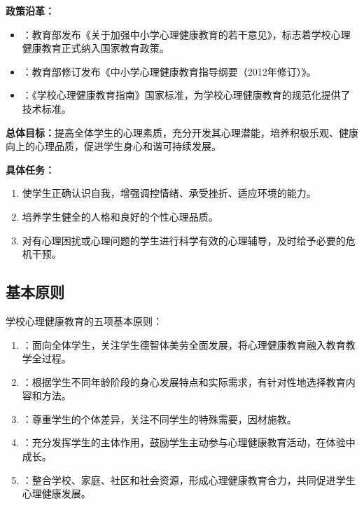 \begin{defbox}
\textbf{政策沿革：}

\begin{itemize}[leftmargin=*]
    \item {}：教育部发布《关于加强中小学心理健康教育的若干意见》，标志着学校心理健康教育正式纳入国家教育政策。
    \item {}：教育部修订发布《中小学心理健康教育指导纲要（2012年修订）》。
    \item {}：《学校心理健康教育指南》国家标准，为学校心理健康教育的规范化提供了技术标准。
\end{itemize}

\textbf{总体目标：}提高全体学生的心理素质，充分开发其心理潜能，培养积极乐观、健康向上的心理品质，促进学生身心和谐可持续发展。

\textbf{具体任务：}
\begin{enumerate}[leftmargin=*]
    \item 使学生正确认识自我，增强调控情绪、承受挫折、适应环境的能力。
    \item 培养学生健全的人格和良好的个性心理品质。
    \item 对有心理困扰或心理问题的学生进行科学有效的心理辅导，及时给予必要的危机干预。
\end{enumerate}
\end{defbox}

\subsection{基本原则}

\begin{keybox}
学校心理健康教育的五项基本原则：

\begin{enumerate}[leftmargin=*]
    \item {}：面向全体学生，关注学生德智体美劳全面发展，将心理健康教育融入教育教学全过程。
    \item {}：根据学生不同年龄阶段的身心发展特点和实际需求，有针对性地选择教育内容和方法。
    \item {}：尊重学生的个体差异，关注不同学生的特殊需要，因材施教。
    \item {}：充分发挥学生的主体作用，鼓励学生主动参与心理健康教育活动，在体验中成长。
    \item {}：整合学校、家庭、社区和社会资源，形成心理健康教育合力，共同促进学生心理健康发展。
\end{enumerate}
\end{keybox}

